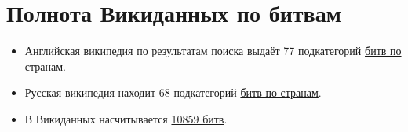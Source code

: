\section{Полнота Викиданных по битвам}
\begin{itemize}
    \item Английская википедия по результатам поиска выдаёт 77 подкатегорий \href{https://commons.wikimedia.org/wiki/Category:Battles_by_country}{битв по странам}.
    \item Русская википедия находит 68 подкатегорий \href{https://ru.wikipedia.org/wiki/%D0%9A%D0%B0%D1%82%D0%B5%D0%B3%D0%BE%D1%80%D0%B8%D1%8F:%D0%A1%D1%80%D0%B0%D0%B6%D0%B5%D0%BD%D0%B8%D1%8F_%D0%BF%D0%BE_%D1%81%D1%82%D1%80%D0%B0%D0%BD%D0%B0%D0%BC}{битв по странам}.

    \item В Викиданных насчитывается \href{https://query.wikidata.org/#%23added%202017-02%0A%23List%20of%20%60instances%20of%60%20%22national%20park%22%20%0ASELECT%20%3Fbattle%20%3FbattleLabel%0AWHERE%0A%7B%0A%20%20%20%20%3Fbattle%20wdt%3AP31%20wd%3AQ178561.%0A%20%20%20%20SERVICE%20wikibase%3Alabel%20%7B%20bd%3AserviceParam%20wikibase%3Alanguage%20%22en%22%20%7D%0A%7D}{10859 битв}.

    \end{itemize}
